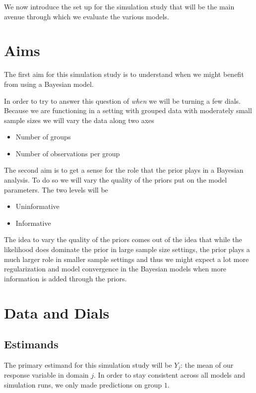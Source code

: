 \documentclass[12pt,twoside]{reedthesis}
\providecommand{\tightlist}{%
  \setlength{\itemsep}{0pt}\setlength{\parskip}{0pt}}
\begin{document}
We now introduce the set up for the simulation study that will be the main avenue through which we evaluate the various models.

\hypertarget{aims}{%
\section{Aims}\label{aims}}

The first aim for this simulation study is to understand when we might benefit from using a Bayesian model.

In order to try to answer this question of \emph{when} we will be turning a few dials. Because we are functioning in a setting with grouped data with moderately small sample sizes we will vary the data along two axes
\begin{itemize}
\tightlist
\item
  Number of groups
\item
  Number of observations per group
\end{itemize}
The second aim is to get a sense for the role that the prior plays in a Bayesian analysis. To do so we will vary the quality of the priors put on the model parameters. The two levels will be
\begin{itemize}
\tightlist
\item
  Uninformative
\item
  Informative
\end{itemize}
The idea to vary the quality of the priors comes out of the idea that while the likelihood does dominate the prior in large sample size settings, the prior plays a much larger role in smaller sample settings and thus we might expect a lot more regularization and model convergence in the Bayesian models when more information is added through the priors.

\hypertarget{data-and-dials}{%
\section{Data and Dials}\label{data-and-dials}}

\hypertarget{estimands}{%
\subsection{Estimands}\label{estimands}}

The primary estimand for this simulation study will be \(Y_j\): the mean of our response variable in domain \(j\). In order to stay consistent across all models and simulation runs, we only made predictions on group \(1\).
\end{document}
